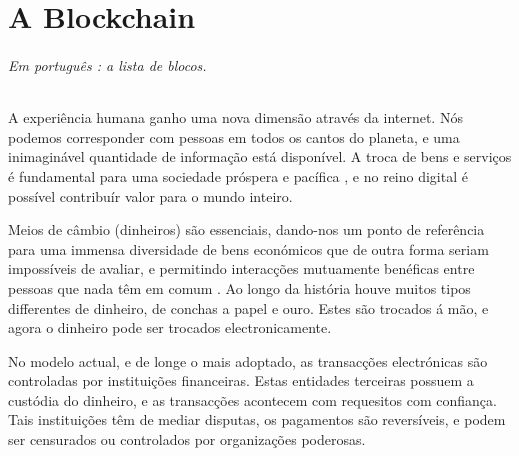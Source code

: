 \chapter{A Blockchain}
\label{chapter:blockchain}
\subparagraph{Em português : a lista de blocos.\newline}

A experiência humana ganho uma nova dimensão através da internet. Nós podemos corresponder com pessoas em todos os cantos do planeta, e uma inimaginável quantidade de informação está disponível. A troca de bens e serviços é fundamental para uma sociedade próspera e pacífica \cite{human-action}, e no reino digital é possível contribuír valor para o mundo inteiro. 


Meios de câmbio (dinheiros) são essenciais, dando-nos um ponto de referência para uma immensa diversidade de bens económicos que de outra forma seriam impossíveis de avaliar, e permitindo interacções mutuamente benéficas entre pessoas que nada têm em comum \cite{human-action}. Ao longo da história houve muitos tipos differentes de dinheiro, de conchas a papel e ouro. Estes são trocados á mão, e agora o dinheiro pode ser trocados electronicamente.


No modelo actual, e de longe o mais adoptado, as transacções electrónicas são controladas por instituições financeiras. Estas entidades terceiras possuem a custódia do dinheiro, e as transacções acontecem com requesitos com confiança. Tais instituições têm de mediar disputas, os pagamentos são reversíveis, e podem ser censurados ou controlados por organizações poderosas.\cite{Nakamoto_bitcoin}


